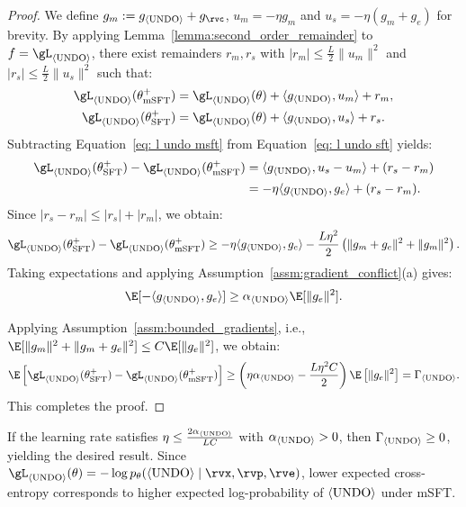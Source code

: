\begin{proof}
We define  $g_m := g_{\bk} + g_\rvc$, $u_m = -\eta g_m$ and $u_s = -\eta(g_m + g_e)$ for brevity.
By applying Lemma~\ref{lemma:second_order_remainder} to $f = \gL_{\bk}$, there exist remainders $r_m, r_s$ with $|r_m| \leq \frac{L}{2}\|u_m\|^2$ and $|r_s| \leq \frac{L}{2}\|u_s\|^2$ such that:
\begin{align}
    \gL_{\bk}(\theta_\text{mSFT}^+) &= \gL_{\bk}(\theta) + \langle g_{\bk}, u_m \rangle + r_m,  \label{eq: l undo msft}\\
    \gL_{\bk}(\theta_\text{SFT}^+) &= \gL_{\bk}(\theta) + \langle g_{\bk}, u_s \rangle + r_s. \label{eq: l undo sft}
\end{align}
Subtracting Equation~\ref{eq: l undo msft} from Equation~\ref{eq: l undo sft} yields:
\begin{align}
    \gL_{\bk}(\theta_\text{SFT}^+) - \gL_{\bk}(\theta_\text{mSFT}^+) &= \langle g_{\bk}, u_s - u_m \rangle + (r_s - r_m) \\
    &= -\eta \langle g_{\bk}, g_e \rangle + (r_s - r_m).
\end{align}
Since $|r_s - r_m| \leq |r_s| + |r_m|$, we obtain:
\begin{equation}
    \gL_{\bk}(\theta_\text{SFT}^+) - \gL_{\bk}(\theta_\text{mSFT}^+) \geq -\eta \langle g_{\bk}, g_e \rangle - \frac{L\eta^2}{2}\left(\|g_m + g_e\|^2 + \|g_m\|^2\right).
\end{equation}
Taking expectations and applying Assumption~\ref{assm:gradient_conflict}(a) gives:
\begin{equation}
    \E[-\langle g_{\bk}, g_e \rangle] \geq \alpha_{\bk} \E[\|g_e\|^2].
\end{equation}

Applying Assumption~\ref{assm:bounded_gradients}, i.e., $\E[\|g_m\|^2 + \|g_m + g_e\|^2] \leq C \E[\|g_e\|^2]$, we obtain:
\begin{equation}
    \E\left[\gL_{\bk}(\theta_\text{SFT}^+) - \gL_{\bk}(\theta_\text{mSFT}^+)\right] \geq \left(\eta \alpha_{\bk} - \frac{L\eta^2 C}{2}\right) \E\left[\|g_e\|^2\right] = \Gamma_{\bk}.
\end{equation}
This completes the proof.
\end{proof}
If the learning rate satisfies $\eta \leq \frac{2\alpha_{\langle\textnormal{UNDO}\rangle}}{LC}$ with $\alpha_{\langle\textnormal{UNDO}\rangle} > 0$, then $\Gamma_{\langle\textnormal{UNDO}\rangle} \geq 0$, yielding the desired result. Since $\gL_{\bk}(\theta) = -\log p_\theta(\bk \mid \rvx, \rvp, \rve)$, lower expected cross-entropy corresponds to higher expected log-probability of $\langle\textnormal{UNDO}\rangle$ under mSFT.


